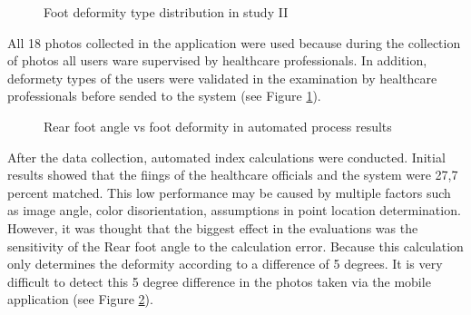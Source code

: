 \begin{figure}[htbp]
\centering
{}
\caption{Foot deformity type distribution in study II}
\label{fig:StudyIIFootDeformityTypeDistribution}
\end{figure} 

All 18 photos collected in the application were used because during the collection of photos all users ware supervised by healthcare professionals. In addition, deformety types of the users were validated in the examination by healthcare professionals before sended to the system (see Figure  \ref{fig:StudyIIFootDeformityTypeDistribution}).

\begin{figure}[htbp]
\centering
{}
\caption{Rear foot angle vs foot deformity in automated process results}
\label{fig:StudyIIFootDeformityAutomatedDegreesAndDeformityResults}
\end{figure} 

After the data collection, automated index calculations were conducted. Initial results showed that the fiings of the healthcare officials and the system were 27,7 percent matched. This low performance may be caused by multiple factors such as image angle, color disorientation, assumptions in point location determination. However, it was thought that the biggest effect in the evaluations was the sensitivity of the Rear foot angle to the calculation error. Because this calculation only determines the deformity according to a difference of 5 degrees. It is very difficult to detect this 5 degree difference in the photos taken via the mobile application (see Figure \ref{fig:StudyIIFootDeformityAutomatedDegreesAndDeformityResults}). 

